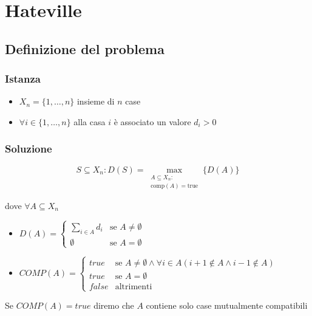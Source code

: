 
\chapter{Hateville}

\section{Definizione del problema}
\subsection{Istanza}
\begin{itemize}
    \item $X_n = \{1, \dots, n\}$ insieme di $n$ case
    \item $\forall i \in \{1,\dots,n\}$ alla casa $i$ è associato un valore $d_i > 0$
\end{itemize}

\subsection{Soluzione}
{
    \large 
    $$
        S \subseteq X_n : D(S) = \max_{\substack{A \subseteq X_n : \\ \text{comp}(A) = \text{true}}} \{ D(A) \}
    $$ 
}

dove $\forall A \subseteq X_n$
\begin{itemize}
    \item $
    D(A) = 
    \begin{cases}
        \sum_{i \in A} d_i & \text{se } A \not = \emptyset \\
        \emptyset & \text{se } A = \emptyset
    \end{cases} 
    $

    \item $COMP(A) =
    \begin{cases}
        true & \text{se } A \not = \emptyset \land \forall i \in A (i+1 \not \in A \land i-1 \not \in A) \\
        true & \text{se } A = \emptyset \\
        false & \text{altrimenti}
    \end{cases}
    $
\end{itemize}

Se $COMP(A) = true$ diremo che $A$ contiene solo case mutualmente compatibili

